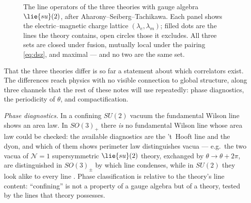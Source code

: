 \begin{figure}[t]
\centering
{}
\caption{The line operators of the three theories with gauge algebra
$\lie{su}(2)$, after Aharony--Seiberg--Tachikawa. Each panel shows the
electric--magnetic charge lattice $(\lambda_e, \lambda_m)$; filled dots
are the lines the theory contains, open circles those it excludes. All
three sets are closed under fusion, mutually local under the pairing
\eqref{eq:dsz}, and maximal --- and no two are the same set.}
\label{fig:line-lattices}
\end{figure}

That the three theories differ is so far a statement about which
correlators exist. The differences reach physics with no visible
connection to global structure, along three channels that the rest of
these notes will use repeatedly: phase diagnostics, the periodicity of
$\theta$, and compactification.

\emph{Phase diagnostics.} In a confining $SU(2)$ vacuum the fundamental
Wilson line shows an area law. In $SO(3)_+$ there \emph{is} no
fundamental Wilson line whose area law could be checked: the available
diagnostics are the 't~Hooft line and the dyon, and which of them shows
perimeter law distinguishes vacua --- e.g.\ the two vacua of
$\mathcal{N}=1$ supersymmetric $\lie{su}(2)$ theory, exchanged by
$\theta \to \theta + 2\pi$, are distinguished in $SO(3)_\pm$ by which
line condenses, while in $SU(2)$ they look alike to every line
. Phase classification is relative to the
theory's line content: ``confining'' is not a property of a gauge
algebra but of a theory, tested by the lines that theory possesses.

